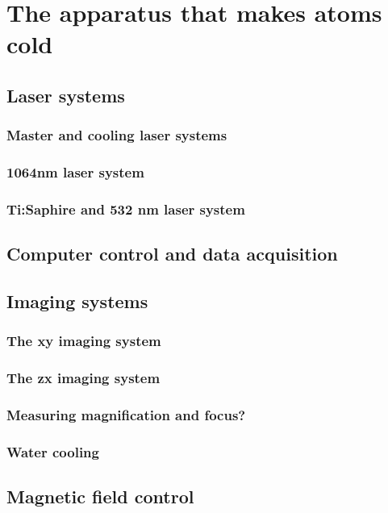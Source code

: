 

\renewcommand{\thechapter}{3}

\chapter{The apparatus that makes atoms cold}



\section{Laser systems}
\subsection{Master and cooling laser systems}
\subsection{1064nm laser system}
\subsection{Ti:Saphire and 532 nm laser system}
\section{Computer control and data acquisition
}
\section{Imaging systems}
\subsection{The xy imaging system}
\subsection{The zx imaging system}
\subsection{Measuring magnification and focus?}

\subsection{Water cooling}

\section{Magnetic field control}
